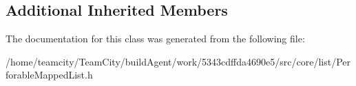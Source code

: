 \subsection*{Additional Inherited Members}


The documentation for this class was generated from the following file\+:\begin{DoxyCompactItemize}
\item 
/home/teamcity/\+Team\+City/build\+Agent/work/5343cdffda4690e5/src/core/list/Perforable\+Mapped\+List.\+h\end{DoxyCompactItemize}
